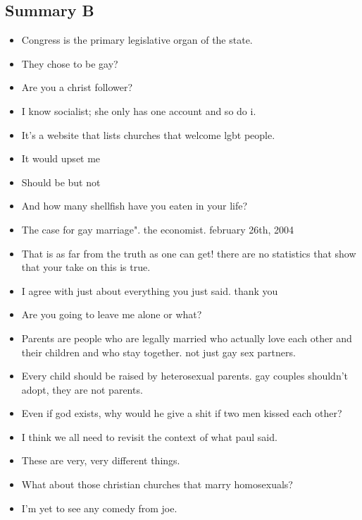 \documentclass[tikz]{article}
\begin{document}
\begin{multicols}{2}
    \vfill
    \columnbreak

    \subsection*{Summary B}
    \begin{itemize}[noitemsep,nolistsep,label={}]
      \item{Congress is the primary legislative organ of the state.}
      \item{They chose to be gay?}
      \item{Are you a christ follower?}
      \item{I know socialist; she only has one account and so do i.}
      \item{It's a website that lists churches that welcome lgbt people.}
      \item{It would upset me}
      \item{Should be but not}
      \item{And how many shellfish have you eaten in your life?}
      \item{The case for gay marriage". the economist. february 26th, 2004}
      \item{That is as far from the truth as one can get! there are no statistics that show that your take on this is true.}
      \item{I agree with just about everything you just said. thank you}
      \item{Are you going to leave me alone or what?}
      \item{Parents are people who are legally married who actually love each other and their children and who stay together. not just gay sex partners.}
      \item{Every child should be raised by heterosexual parents. gay couples shouldn't adopt, they are not parents.}
      \item{Even if god exists, why would he give a shit if two men kissed each other?}
      \item{I think we all need to revisit the context of what paul said.}
      \item{These are very, very different things.}
      \item{What about those christian churches that marry homosexuals?}
      \item{I'm yet to see any comedy from joe.}

\end{itemize}
\end{multicols}
\end{document}
